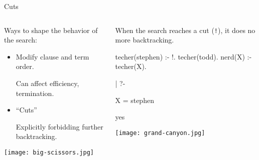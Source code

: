 \documentclass{plt}
\begin{document}
\begin{frame}[fragile=singleslide]{Cuts}

  \begin{columns}
    \begin{column}{0.5\textwidth}

Ways to shape the behavior of the search:

\begin{itemize}

\item Modify clause and term order.

 Can affect efficiency, termination.

\item ``Cuts''

Explicitly forbidding further backtracking.

\end{itemize}

\texttt{[image: big-scissors.jpg]}

    \end{column}
    \begin{column}{0.5\textwidth}

When the search reaches a cut (\texttt{!}), it does no more
backtracking.

\begin{prolog}
techer(stephen) :- !.
techer(todd).
nerd(X) :- techer(X).
\end{prolog}

\begin{interactive}
| ?- 

X = stephen

yes
\end{interactive}   

\texttt{[image: grand-canyon.jpg]}
    \end{column}
  \end{columns}

\end{frame}
\end{document}
